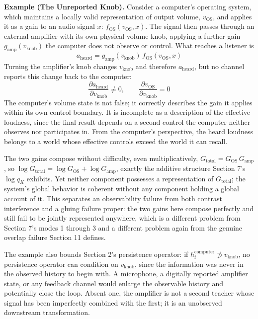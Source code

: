 \documentclass[11pt]{article}
\begin{document}
\begin{mdframed}
\textbf{Example (The Unreported Knob).} Consider a computer's operating system, which maintains a locally valid representation of output volume, $v_{\text{OS}}$, and applies it as a gain to an audio signal $x$: $f_{\text{OS}}(v_{\text{OS}}, x)$. The signal then passes through an external amplifier with its own physical volume knob, applying a further gain $g_{\text{amp}}(v_{\text{knob}})$ the computer does not observe or control. What reaches a listener is
\[
a_{\text{heard}} = g_{\text{amp}}(v_{\text{knob}}) \, f_{\text{OS}}(v_{\text{OS}}, x)
\]
Turning the amplifier's knob changes $v_{\text{knob}}$ and therefore $a_{\text{heard}}$, but no channel reports this change back to the computer:
\[
\frac{\partial a_{\text{heard}}}{\partial v_{\text{knob}}} \neq 0, \qquad \frac{\partial v_{\text{OS}}}{\partial v_{\text{knob}}} = 0
\]
The computer's volume state is not false; it correctly describes the gain it applies within its own control boundary. It is incomplete as a description of the effective loudness, since the final result depends on a second control the computer neither observes nor participates in. From the computer's perspective, the heard loudness belongs to a world whose effective controls exceed the world it can recall.

The two gains compose without difficulty, even multiplicatively, $G_{\text{total}} = G_{\text{OS}} \, G_{\text{amp}}$, so $\log G_{\text{total}} = \log G_{\text{OS}} + \log G_{\text{amp}}$, exactly the additive structure Section 7's $\log q_K$ exhibits. Yet neither component possesses a representation of $G_{\text{total}}$; the system's global behavior is coherent without any component holding a global account of it. This separates an observability failure from both contrast interference and a gluing failure proper: the two gains here compose perfectly and still fail to be jointly represented anywhere, which is a different problem from Section 7's modes 1 through 3 and a different problem again from the genuine overlap failure Section 11 defines.

The example also bounds Section 2's persistence operator: if $h_t^{\text{computer}} \not\supset v_{\text{knob}}$, no persistence operator can condition on $v_{\text{knob}}$, since the information was never in the observed history to begin with. A microphone, a digitally reported amplifier state, or any feedback channel would enlarge the observable history and potentially close the loop. Absent one, the amplifier is not a second teacher whose signal has been imperfectly combined with the first; it is an unobserved downstream transformation.
\end{mdframed}
\end{document}
